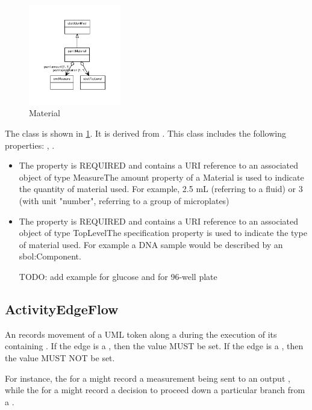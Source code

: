 \begin{figure}[h!]%
\centering%
\includegraphics[width=0.35893617021276597\textwidth]{labop_classes/Material_abstraction_hierarchy.pdf}%
\caption{Material}%
\label{fig:Material}%
\end{figure}

%
The  class is shown in \ref{fig:Material}. It is derived from .%
This class includes the following properties: , . %
\begin{itemize}%
\item%
The  property is REQUIRED and contains a URI reference to an associated object of type MeasureThe amount property of a Material is used to indicate the quantity of material used.
        For example, 2.5 mL (referring to a fluid) or 3 (with unit "number", referring to a group of microplates)%
\item%
The  property is REQUIRED and contains a URI reference to an associated object of type TopLevelThe specification property is used to indicate the type of material used.
        For example a DNA sample would be described by an sbol:Component.

        TODO: add example for glucose and for 96-well plate%
\end{itemize}%
\subsection{ActivityEdgeFlow}%
\label{sec:labop:ActivityEdgeFlow}%
An  records  movement of a UML token along a  during the
        execution of its containing . If the edge is a , then the value MUST be set.
        If the edge is a , then the value MUST NOT be set.

        For instance, the  for a  might record a measurement being sent to an output
        , while the  for a  might record a decision to proceed down a
        particular branch from a .


